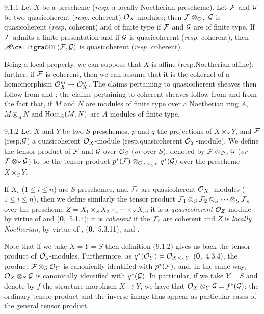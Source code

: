 
\begin{env}[Proposition]{9.1.1}
Let $X$ be a prescheme
(\emph{resp.} a locally Noetherian prescheme). Let $\mathcal{F}$ and $\mathcal{G}$
be two quasicoherent (\emph{resp.} coherent) $\mathcal{O}_X$-modules; then
$\mathcal{F}\otimes_{\mathcal{O}_X}\mathcal{G}$ is quasicoherent (\emph{resp.} coherent) and
of finite type if $\mathcal{F}$ and $\mathcal{G}$ are of finite type. If
$\mathcal{F}$ admits a finite presentation and if $\mathcal{G}$ is quasicoherent
(\emph{resp.} coherent), then $\sheafHom(\sheaf{F},\sheaf{G})$ is quasicoherent
(\emph{resp.} coherent).
\end{env}

Being a local property, we can suppose that $X$ is affine (resp.Noetherian
affine); further, if $\mathcal{F}$ is coherent, then we can assume that it is the
cokernel of a homomorphism $\mathcal{O}_X^m\to\mathcal{O}_X^n$. The claims pertaining to
quasicoherent sheaves then follow from  and ; the
claims pertaining to coherent sheaves follow from  and from the fact
that, if $M$ and $N$ are modules of finite type over a Noetherian ring $A$,
$M\otimes_A N$ and $\operatorname{Hom}_A(M,N)$ are $A$-modules of finite type.

\begin{env}[Definition]{9.1.2}
Let $X$ and $Y$ be two $S$-preschemes, $p$ and
$q$ the projections of $X\times_S Y$, and $\mathcal{F}$ (resp.$\mathcal{G}$) a
quasicoherent $\mathcal{O}_X$-module (resp.quasicoherent $\mathcal{O}_Y$-module). We define the
tensor product of $\mathcal{F}$ and $\mathcal{G}$ over $\mathcal{O}_S$ (\emph{or} over $S$),
denoted by $\mathcal{F}\otimes_{\mathcal{O}_S}\mathcal{G}$ (\emph{or}
$\mathcal{F}\otimes_S\mathcal{G}$) to be the tensor product
$p^\ast(\mathcal{F})\otimes_{\mathcal{O}_{X\times_S Y}}q^\ast(\mathcal{G})$ over the
prescheme $X\times_S Y$.
\end{env}


If $X_i$ ($1\leq i\leq n$) are $S$-preschemes, and $\mathcal{F}_i$ are
quasicoherent $\mathcal{O}_{X_i}$-modules ($1\leq i\leq n$), then we define similarly the
tensor product
$\mathcal{F}_1\otimes_S\mathcal{F}_2\otimes_S\cdots\otimes_S\mathcal{F}_n$ over the
prescheme $Z=X_1\times_S X_2\times_s\cdots\times_S X_n$; it is a
\emph{quasicoherent} $\mathcal{O}_Z$-module by virtue of  and
(\textbf{0},~5.1.4); it is \emph{coherent} if the $\mathcal{F}_i$ are coherent and
$Z$ is \emph{locally Noetherian}, by virtue of ,
(\textbf{0},~5.3.11), and .

Note that if we take $X=Y=S$ then definition (9.1.2) gives us back the tensor
product of $\mathcal{O}_S$-modules. Furthermore, as $q^\ast(\mathcal{O}_Y)=\mathcal{O}_{X\times_S Y}$
(\textbf{0},~4.3.4), the product $\mathcal{F}\otimes_S\mathcal{O}_Y$ is canonically
identified with $p^\ast(\mathcal{F})$, and, in the same way,
$\mathcal{O}_X\otimes_S\mathcal{G}$ is canonically identified with $q^\ast(\mathcal{G})$. In
particular, if we take $Y=S$ and denote by $f$ the structure morphism $X\to Y$,
we have that $\mathcal{O}_X\otimes_Y\mathcal{G}=f^\ast(\mathcal{G})$: the ordinary tensor
product and the inverse image thus appear as particular cases of the general
tensor product.

